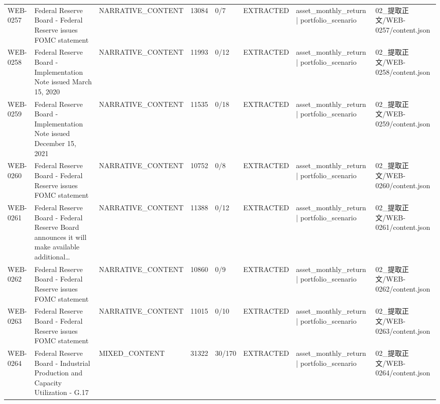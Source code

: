 \begin{landscape}
\begin{longtable}{p{1.8cm}p{4.2cm}p{3.0cm}p{1.4cm}p{1.6cm}p{2.4cm}p{4.2cm}p{4.2cm}}
WEB-0257 & Federal Reserve Board - Federal Reserve issues FOMC statement & NARRATIVE\_\allowbreak{}CONTENT & 13084 & 0/\allowbreak{}7 & EXTRACTED & asset\_\allowbreak{}monthly\_\allowbreak{}return | portfolio\_\allowbreak{}scenario & 02\_\allowbreak{}提取正文/\allowbreak{}WEB-0257/\allowbreak{}content.json\\
WEB-0258 & Federal Reserve Board - Implementation Note issued March 15, 2020 & NARRATIVE\_\allowbreak{}CONTENT & 11993 & 0/\allowbreak{}12 & EXTRACTED & asset\_\allowbreak{}monthly\_\allowbreak{}return | portfolio\_\allowbreak{}scenario & 02\_\allowbreak{}提取正文/\allowbreak{}WEB-0258/\allowbreak{}content.json\\
WEB-0259 & Federal Reserve Board - Implementation Note issued December 15, 2021 & NARRATIVE\_\allowbreak{}CONTENT & 11535 & 0/\allowbreak{}18 & EXTRACTED & asset\_\allowbreak{}monthly\_\allowbreak{}return | portfolio\_\allowbreak{}scenario & 02\_\allowbreak{}提取正文/\allowbreak{}WEB-0259/\allowbreak{}content.json\\
WEB-0260 & Federal Reserve Board - Federal Reserve issues FOMC statement & NARRATIVE\_\allowbreak{}CONTENT & 10752 & 0/\allowbreak{}8 & EXTRACTED & asset\_\allowbreak{}monthly\_\allowbreak{}return | portfolio\_\allowbreak{}scenario & 02\_\allowbreak{}提取正文/\allowbreak{}WEB-0260/\allowbreak{}content.json\\
WEB-0261 & Federal Reserve Board - Federal Reserve Board announces it will make available additional… & NARRATIVE\_\allowbreak{}CONTENT & 11388 & 0/\allowbreak{}12 & EXTRACTED & asset\_\allowbreak{}monthly\_\allowbreak{}return | portfolio\_\allowbreak{}scenario & 02\_\allowbreak{}提取正文/\allowbreak{}WEB-0261/\allowbreak{}content.json\\
WEB-0262 & Federal Reserve Board - Federal Reserve issues FOMC statement & NARRATIVE\_\allowbreak{}CONTENT & 10860 & 0/\allowbreak{}9 & EXTRACTED & asset\_\allowbreak{}monthly\_\allowbreak{}return | portfolio\_\allowbreak{}scenario & 02\_\allowbreak{}提取正文/\allowbreak{}WEB-0262/\allowbreak{}content.json\\
WEB-0263 & Federal Reserve Board - Federal Reserve issues FOMC statement & NARRATIVE\_\allowbreak{}CONTENT & 11015 & 0/\allowbreak{}10 & EXTRACTED & asset\_\allowbreak{}monthly\_\allowbreak{}return | portfolio\_\allowbreak{}scenario & 02\_\allowbreak{}提取正文/\allowbreak{}WEB-0263/\allowbreak{}content.json\\
WEB-0264 & Federal Reserve Board - Industrial Production and Capacity Utilization - G.17 & MIXED\_\allowbreak{}CONTENT & 31322 & 30/\allowbreak{}170 & EXTRACTED & asset\_\allowbreak{}monthly\_\allowbreak{}return | portfolio\_\allowbreak{}scenario & 02\_\allowbreak{}提取正文/\allowbreak{}WEB-0264/\allowbreak{}content.json\\

\end{longtable}
\end{landscape}
